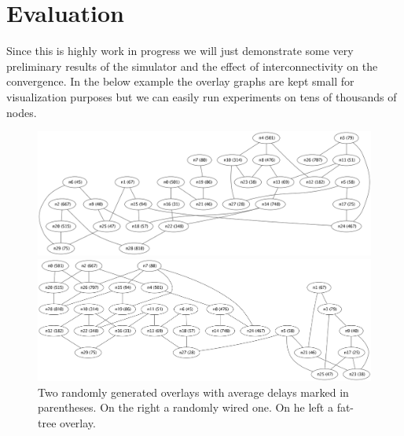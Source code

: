 \documentclass[12pt,notitlepage]{article}
\begin{document}
\section{Evaluation}
Since this is highly work in progress we will just demonstrate some very preliminary results of 
the simulator and the effect of interconnectivity on the convergence. In the below example 
the overlay graphs are kept small for visualization purposes but we can easily run experiments on tens
of thousands of nodes.
\begin{figure}
\centering
\begin{minipage}{.5\linewidth}
\centering
\includegraphics[scale=0.15]{img/graph-random.png}
\end{minipage}%
\begin{minipage}{.5\linewidth}
\centering
\includegraphics[scale=0.15]{img/graph-fat.png}
\end{minipage}
\caption{Two randomly generated overlays with average delays marked in parentheses. On the right a randomly wired one. On he left a fat-tree overlay.}
\end{figure}
\end{document}

